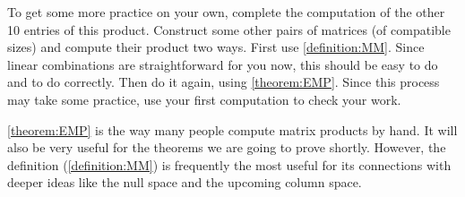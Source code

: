 \documentclass{ximera}
\begin{document}
\begin{example}
  To get some more practice on your own, complete the computation of
  the other 10 entries of this product.  Construct some other pairs of
  matrices (of compatible sizes) and compute their product two ways.
  First use \ref{definition:MM}.  Since linear combinations are
  straightforward for you now, this should be easy to do and to do
  correctly.  Then do it again, using \ref{theorem:EMP}.  Since this
  process may take some practice, use your first computation to check
  your work.
\end{example}

\ref{theorem:EMP} is the way many people compute matrix products by
hand.  It will also be very useful for the theorems we are going to
prove shortly.  However, the definition (\ref{definition:MM}) is
frequently the most useful for its connections with deeper ideas like
the null space and the upcoming column space.
\end{document}
